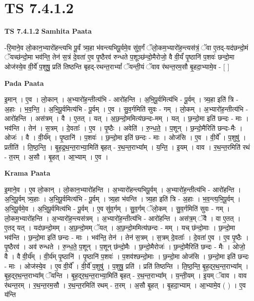 \documentclass[17pt]{extarticle}
\begin{document}
\section{ TS 7.4.1.2 }

\textbf{TS 7.4.1.2 } \newline
\textbf{Samhita Paata} \newline

-रि॒माने॒व लो॒कान॒भ्यारो॑हन्त्यभि पू॒र्वं त्र्य॒हा भ॑वन्त्यभिपू॒र्वमे॒व सु॑व॒र्गं ॅलो॒कम॒भ्यारो॑ह॒न्त्यस॑त्रं॒ ॅवा ए॒तद्-यद॑छन्दो॒मं ॅयच्छ॑न्दो॒मा भव॑न्ति॒ तेन॑ स॒त्रं दे॒वता॑ ए॒व पृ॒ष्ठैरव॑ रुन्धते प॒शूञ्छ॑न्दो॒मैरोजो॒ वै वी॒र्यं॑ पृ॒ष्ठानि॑ प॒शवः॑ छन्दो॒मा ओज॑स्ये॒व वी॒र्ये॑ प॒शुषु॒ प्रति॑ तिष्ठन्ति बृहद्-रथन्त॒राभ्यां᳚ ॅयन्ती॒यं ॅवाव र॑थन्त॒रम॒सौ बृ॒हदा॒भ्यामे॒व - [  ] \newline

\textbf{Pada Paata} \newline

इ॒मान् । ए॒व । लो॒कान् । अ॒भ्यारो॑ह॒न्तीत्य॑भि - आरो॑हन्ति । अ॒भि॒पू॒र्वमित्य॑भि - पू॒र्वम् । त्र्य॒हा इति॑ त्रि - अ॒हाः । भ॒व॒न्ति॒ । अ॒भि॒पू॒र्वमित्य॑भि - पू॒र्वम् । ए॒व । सु॒व॒र्गमिति॑ सुवः - गम् । लो॒कम् । अ॒भ्यारो॑ह॒न्तीत्य॑भि - आरो॑हन्ति । अस॑त्रम् । वै । ए॒तत् । यत् । अ॒छ॒न्दो॒ममित्य॑छन्दः-मम् । यत् । छ॒न्दो॒मा इति॑ छन्दः - माः । भव॑न्ति । तेन॑ । स॒त्रम् । दे॒वताः᳚ । ए॒व । पृ॒ष्ठैः । अवेति॑ । रु॒न्ध॒ते॒ । प॒शून् । छ॒न्दो॒मैरिति॑ छन्दः-मैः । ओजः॑ । वै । वी॒र्य᳚म् । पृ॒ष्ठानि॑ । प॒शवः॑ । छ॒न्दो॒मा इति॑ छन्दः - माः । ओज॑सि । ए॒व । वी॒र्ये᳚ । प॒शुषु॑ । प्रतीति॑ । ति॒ष्ठ॒न्ति॒ । बृ॒ह॒द्र॒थ॒न्त॒राभ्या॒मिति॑ बृहत् - र॒थ॒न्त॒राभ्या᳚म् । य॒न्ति॒ । इ॒यम् । वाव । र॒थ॒न्त॒रमिति॑ रथं - त॒रम् । अ॒सौ । बृ॒हत् । आ॒भ्याम् । ए॒व ।  \newline


\textbf{Krama Paata} \newline

इ॒माने॒व । ए॒व लो॒कान् । लो॒कान॒भ्यारो॑हन्ति । अ॒भ्यारो॑हन्त्यभिपू॒र्वम् । अ॒भ्यारो॑ह॒न्तीत्य॑भि - आरो॑हन्ति । अ॒भि॒पू॒र्वम् त्र्य॒हाः । अ॒भि॒पू॒र्वमित्य॑भि - पू॒र्वम् । त्र्य॒हा भ॑वन्ति । त्र्य॒हा इति॑ त्रि - अ॒हाः । भ॒व॒न्त्य॒भि॒पू॒र्वम् । अ॒भि॒पू॒र्वमे॒व । अ॒भि॒पू॒र्वमित्य॑भि - पू॒र्वम् । ए॒व सु॑व॒र्गम् । सु॒व॒र्गम् ॅलो॒कम् । सु॒व॒र्गमिति॑ सुवः - गम् । लो॒कम॒भ्यारो॑हन्ति । अ॒भ्यारो॑ह॒न्त्यस॑त्रम् । अ॒भ्यारो॑ह॒न्तीत्य॑भि - आरो॑हन्ति । अस॑त्र॒म् ॅवै । वा ए॒तत् । ए॒तद् यत् । यद॑छन्दो॒मम् । अ॒छ॒न्दो॒मम् ॅयत् । अ॒छ॒न्दो॒ममित्य॑छन्दः - मम् । यच् छ॑न्दो॒माः । छ॒न्दो॒मा भव॑न्ति । छ॒न्दो॒मा इति॑ छन्दः - माः । भव॑न्ति॒ तेन॑ । तेन॑ स॒त्रम् । स॒त्रम् दे॒वताः᳚ । दे॒वता॑ ए॒व । ए॒व पृ॒ष्ठैः । पृ॒ष्ठैरव॑ । अव॑ रुन्धते । रु॒न्ध॒ते॒ प॒शून् । प॒शून् छ॑न्दो॒मैः । छ॒न्दो॒मैरोजः॑ । छ॒न्दो॒मैरिति॑ छन्दः - मैः । ओजो॒ वै । वै वी॒र्य᳚म् । वी॒र्य॑म् पृ॒ष्ठानि॑ । पृ॒ष्ठानि॑ प॒शवः॑ । प॒शव॑श्छन्दो॒माः । छ॒न्दो॒मा ओज॑सि । छ॒न्दो॒मा इति॑ छन्दः - माः । ओज॑स्ये॒व । ए॒व वी॒र्ये᳚ । वी॒र्ये॑ प॒शुषु॑ । प॒शुषु॒ प्रति॑ । प्रति॑ तिष्ठन्ति । ति॒ष्ठ॒न्ति॒ बृ॒ह॒द्‍र॒थ॒न्त॒राभ्या᳚म् । बृ॒ह॒द्‍र॒थ॒न्त॒राभ्या᳚म् ॅयन्ति । बृ॒ह॒द्‍र॒थ॒न्त॒राभ्या॒मिति॑ बृहत् - र॒थ॒न्त॒राभ्या᳚म् । य॒न्ती॒यम् । इ॒यम् ॅवाव । वाव र॑थन्त॒रम् । र॒थ॒न्त॒रम॒सौ । र॒थ॒न्त॒रमिति॑ रथम् - त॒रम् । अ॒सौ बृ॒हत् । बृ॒हदा॒भ्याम् । आ॒भ्यामे॒व ( ) । ए॒व य॑न्ति \newline
\end{document}
